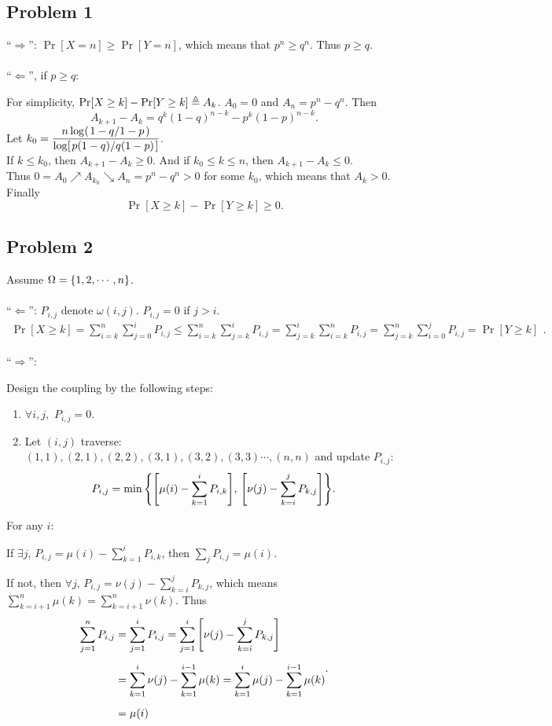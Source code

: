 \documentclass{article}
\begin{document}
\subsection*{Problem 1}
``$\Longrightarrow$'': $\Pr[X=n]\ge \Pr[Y=n]$, which means that $p^n\ge q^n$. Thus $p\ge q$.
\\\\
``$\Longleftarrow$'', if $p\ge q$:

For simplicity, $\Pr[X\ge k]-\Pr[Y\ge k]\triangleq A_k$. $A_0=0$ and $A_n=p^n-q^n$.
Then
\[
	A_{k+1}-A_{k}=q^k(1-q)^{n-k}-p^k(1-p)^{n-k}
	.\]
Let $\displaystyle k_0=\frac{n\log(\flatfrac{1-q}{1-p})}{\log[\flatfrac{p(1-q)}{q(1-p)}]}$.
\\[9pt]
If $k\le k_0$, then $A_{k+1}-A_k\ge 0$. And if $k_0\le k\le n$,
then $A_{k+1}-A_k\le 0.$
\\[6pt]
Thus $0=A_0\nearrow A_{k_0}\searrow A_{n}=p^n-q^n>0$ for some $k_0$, which means that $A_k>0$.
\\[6pt]
Finally \[\Pr[X\ge k]-\Pr[Y\ge k]\ge 0.\]

\subsection*{Problem 2}
Assume $\Omega=\qty{1,2, \cdots,n}$.
\\\\
``$\Longleftarrow$'': $P_{i,j}$ denote  $\omega(i,j)$.  $P_{i,j}=0$ if  $j>i$.
\[
	\begin{aligned}
		\Pr[X\ge k]=\sum_{i=k}^n\sum_{j=0}^iP_{i,j}
		\le
		\sum_{i=k}^n\sum_{j=k}^iP_{i,j}
		=
		\sum_{j=k}^i\sum_{i=k}^nP_{i,j}
		=
		\sum_{j=k}^n\sum_{i=0}^jP_{i,j}
		=
		\Pr[Y\ge k]
	\end{aligned}
	.\]

``$\Longrightarrow$'':

Design the coupling by the following steps:
\begin{enumerate}
	\item
	      $\forall i,j,\,\,P_{i,j}=0$.
	\item
	      Let  $(i,j)$ traverse: $(1,1),(2,1),(2,2),(3,1),(3,2),(3,3)\cdots,(n,n)$ and update  $P_{i,j}$:
	      \[
		      P_{i,j}=\min\qty{\qty[\mu(i)-\sum_{k=1}^iP_{i,k}],\,\qty[\nu(j)-\sum_{k=i}^jP_{k,j}]}
		      .\]
\end{enumerate}
For any $i$:

If $\exists j$, $P_{i,j}=\mu(i)-\sum_{k=1}^iP_{i,k}$, then $\sum_jP_{i,j}=\mu(i)$.

If not, then $\forall j,\, P_{i,j}=\nu(j)-\sum_{k=i}^jP_{k,j}$, which means $\sum_{k=i+1}^n\mu(k)=\sum_{k=i+1}^n\nu(k)$. Thus
\[
	\begin{aligned}
		\sum_{j=1}^nP_{i,j}
		&=
		\sum_{j=1}^iP_{i,j}
		=
		\sum_{j=1}^i\qty[\nu(j)-\sum_{k=i}^jP_{k,j}]
		\\[5pt]&=
		\sum_{k=1}^i\nu(j)-\sum_{k=1}^{i-1}\mu(k)
		=
		\sum_{k=1}^i\mu(j)-\sum_{k=1}^{i-1}\mu(k)
		\\[5pt]&=
		\mu(i)
	\end{aligned}
.\]
\end{document}
